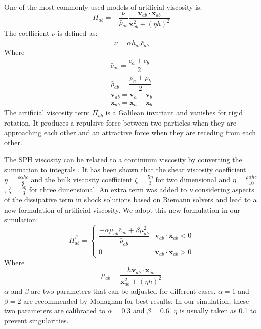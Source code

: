 \documentclass[journal abbreviation, manuscript]{copernicus}
\begin{document}
One of the most commonly used models of artificial viscosity is:
\begin{equation}
\Pi_{ab}=- \frac{\nu}{\bar{\rho}_{ab}} \dfrac{ \textbf{v}_{ab} \cdot \textbf{x}_{ab}}{\textbf{x}_{ab}^2 + \left(\eta h\right)^2}
\label{eq:art-vis-original}
\end{equation}
The coefficient $\nu$ is defined as:
\begin{equation}
\nu = \alpha \bar{h}_{ab} \bar{c}_{ab}
\end{equation}
Where 
\begin{align}
\bar{c}_{ab} = \dfrac{c_a + c_b}{2} \\
\bar{\rho}_{ab} = \dfrac{\rho_a + \rho_b}{2} \\
\textbf{v}_{ab}=\textbf{v}_a-\textbf{v}_b \\
\textbf{x}_{ab}=\textbf{x}_a-\textbf{x}_b
\end{align}
The artificial viscosity term $\Pi_{ab}$ is a Galilean invariant and vanishes for rigid rotation. It produces a repulsive force between two particles when they are approaching each other and an attractive force when they are receding from each other. 

The SPH viscosity can be related to a continuum viscosity by converting the summation to integrals \citep{monaghan2005smoothed}. It has been shown that the shear viscosity coefficient $\eta = \frac{\rho \alpha h c}{8} $ and the bulk viscosity coefficient $ \zeta = \frac{5 \eta}{3}$ for two dimensional and $\eta = \frac{\rho \alpha h c}{10} $ , $ \zeta = \frac{5 \eta}{3}$ for three dimensional.
An extra term was added to $\nu$ considering aspects of the dissipative term in shock solutions based on Riemann solvers and lead to a new formulation of artificial viscosity. We adopt this new formulation in our simulation:
\begin{equation}
\Pi_{ab}^{\beta} = 
\begin{cases} 
      \dfrac{- \alpha \mu_{ab} \bar{c}_{ab} + \beta \mu_{ab}^2} {\bar{\rho}_{ab}} & \textbf{v}_{ab} \cdot \textbf{x}_{ab} < 0\\
      0 & \textbf{v}_{ab} \cdot \textbf{x}_{ab} > 0
\end{cases}
\label{eq:art-vis-shock}
\end{equation}
Where
\begin{equation}
\mu_{ab} = \dfrac{h \textbf{v}_{ab} \cdot \textbf{x}_{ab}}{\textbf{x}_{ab}^2 + \left(\eta h\right)^2} 
\end{equation}
$\alpha$ and $\beta$ are two parameters that can be adjusted for different cases.
$\alpha = 1$ and $\beta = 2$ are  recommended by Monaghan for best results. In our simulation, these two parameters are calibrated to  $\alpha = 0.3$ and $\beta = 0.6$. $\eta$ is usually taken as 0.1 to prevent singularities.
\end{document}
